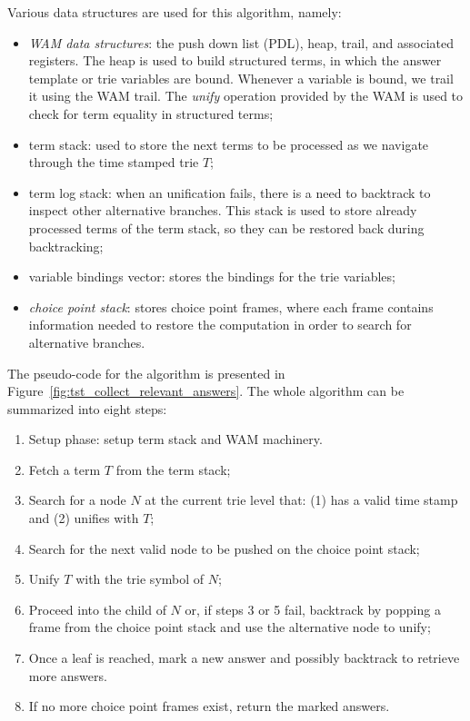 Various data structures are used for this algorithm, namely:

\begin{itemize}
  \item \textit{WAM data structures}: the push down list (PDL),
  heap, trail, and associated registers. The heap is used to build structured terms, in which the
  answer template or trie variables are bound. Whenever a variable is bound, we trail it using the WAM trail. The \textit{unify} operation provided by the WAM is used to check for term equality in structured terms;
  
  \item term stack: used to store the next terms to be processed as we navigate through the time
   stamped trie $T$;
  
  \item term log stack: when an unification fails, there is a need to backtrack to inspect other
  alternative branches. This stack is used to store already processed terms of the term stack,
  so they can be restored back during backtracking;
  
  \item variable bindings vector: stores the bindings for the trie variables;
  
  \item \textit{choice point stack}: stores choice point frames, where each frame contains
  information needed to restore the computation in order to search for alternative branches.
\end{itemize}

The pseudo-code for the algorithm is presented in Figure~\ref{fig:tst_collect_relevant_answers}.
The whole algorithm can be summarized into eight steps:

\begin{enumerate}
  \item Setup phase: setup term stack and WAM machinery.
  \item Fetch a term $T$ from the term stack;
  \item Search for a node $N$ at the current trie level that: (1) has a valid time stamp and (2)
  unifies with $T$;
  \item Search for the next valid node to be pushed on the choice point stack;
  \item Unify $T$ with the trie symbol of $N$;
  \item Proceed into the child of $N$ or, if steps 3 or 5 fail, backtrack by popping a frame from the choice point stack and use the alternative node to unify;
  \item Once a leaf is reached, mark a new answer and possibly backtrack to retrieve more answers.
  \item If no more choice point frames exist, return the marked answers.
\end{enumerate}

